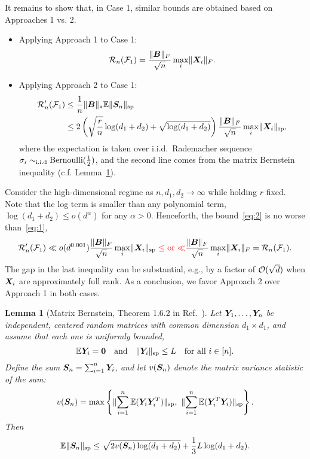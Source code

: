 \documentclass[11pt]{article}
\theoremstyle{plain}
\newtheorem{lem}{Lemma}
\theoremstyle{definition}
\begin{document}
It remains to show that, in Case 1, similar bounds are obtained based on Approaches 1 vs. 2.

\begin{itemize}
\item Applying Approach 1 to Case 1: 
\begin{equation}\label{eq:1}
\mathcal{R}_n(\mathcal{F}_1)={\lVert\bm B\rVert_F \over \sqrt{n} } \max_i\lVert\bm X_i\rVert_F.
\end{equation}
\item Applying Approach 2 to Case 1:
\begin{align}\label{eq:2}
\mathcal{R}'_n(\mathcal{F}_1)& \leq {1\over n}\lVert\bm B\rVert_*\mathbb{E}\lVert\bm S_n\rVert_\text{sp}\notag \\
& \leq 2\left(\sqrt{r\over n} \log (d_1+d_2)  + {\sqrt{\log (d_1+d_2)}}\right) {\lVert\bm B\rVert_F\over \sqrt{n}} \max_i \lVert\bm X_i\rVert_\text{sp},
\end{align}
where the expectation is taken over i.i.d.\ Rademacher sequence $\sigma_i\sim_{\text{i.i.d}}\text{Bernoulli}({1\over 2})$, and the second line comes from the matrix Bernstein inequality (c.f. Lemma~\ref{lem:1}). 
\end{itemize}

Consider the high-dimensional regime as $n, d_1, d_2\to \infty$ while holding $r$ fixed. Note that the log term is smaller than any polynomial term, $\log (d_1+d_2)\leq o(d^\alpha)$ for any $\alpha>0$. Henceforth, the bound~\eqref{eq:2} is no worse than~\eqref{eq:1},
\[
\mathcal{R}'_n(\mathcal{F}_1) \ll o(d^{0.001}){\lVert\bm B\rVert_F\over \sqrt{n}} \max_i \lVert\bm X_i\rVert_\text{sp} \ {\color{red}\leq \text{or} \ll }{\lVert\bm B\rVert_F\over \sqrt{n}} \max_i \lVert\bm X_i\rVert_F = \mathcal{R}_n(\mathcal{F}_1).
\]
The gap in the last inequality can be substantial, e.g., by a factor of $\mathcal{O}(\sqrt{d})$ when $\bm X_i$ are approximately full rank.  As a conclusion, we favor Approach 2 over Approach 1 in both cases.  \\

\begin{lem}[Matrix Bernstein, Theorem 1.6.2 in Ref.~\cite{tropp2015introduction}]\label{lem:1}Let $\bm Y_1, \ldots, \bm Y_n$ be independent, centered random matrices with common dimension $d_1\times d_1$, and assume that each one is uniformly bounded, 
\[
\mathbb{E}\bm Y_i=\mathbf{0}\quad \text{and}\quad \lVert\bm Y_i\rVert_\text{sp}\leq L\quad \text{for all }i\in[n].
\]
Define the sum $\bm S_n=\sum_{i=1}^n\bm Y_i$, and let $v(\bm S_n)$ denote the matrix variance statistic of the sum:
\[
v(\bm S_n)=\max\left\{\lVert\sum_{i=1}^n \mathbb{E}(\bm Y_i\bm Y^T_i)\rVert_\text{sp},\ \lVert\sum_{i=1}^n \mathbb{E}(\bm Y^T_i\bm Y_i)\rVert_\text{sp}\right\}.
\]
Then
\begin{equation}\label{eq:bound}
\mathbb{E}\lVert\bm S_n\rVert_\text{sp}\leq\sqrt{2v(\bm S_n)\log (d_1+d_2)}+{1\over 3} L \log (d_1+d_2).
\end{equation}
\end{lem}
\end{document}
